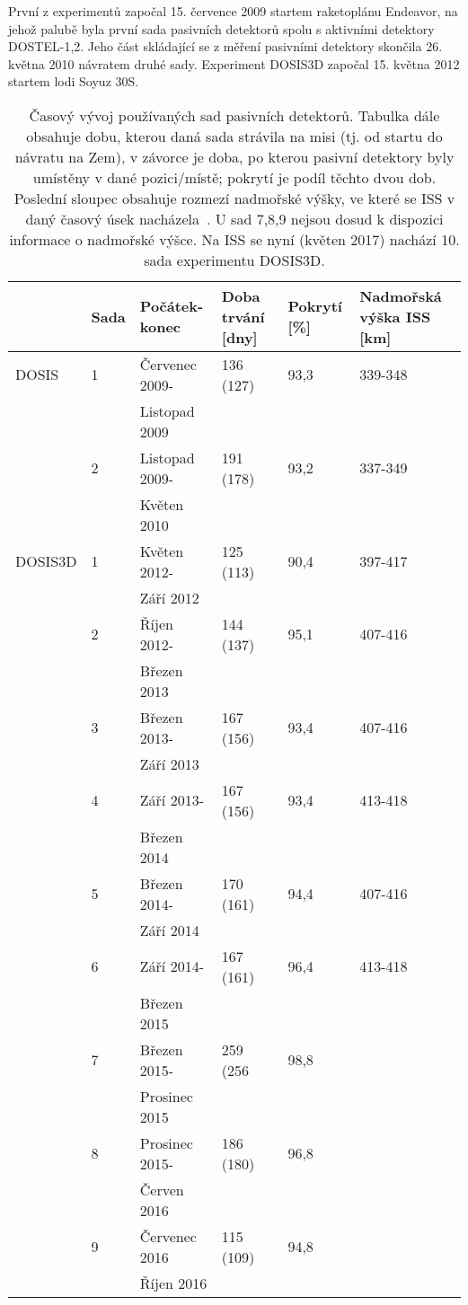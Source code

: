 První z experimentů započal 15. července 2009 startem raketoplánu Endeavor, na jehož palubě byla
první sada pasivních detektorů spolu s aktivními detektory \mbox{DOSTEL-1,2}. Jeho část skládající se z měření pasivními detektory skončila 26. května 2010 návratem druhé sady. Experiment DOSIS3D započal 15. května 2012 startem lodi Soyuz 30S. 
\begin{table}[ht]
  \centering
\footnotesize
  \caption{Časový vývoj používaných sad pasivních detektorů. Tabulka dále obsahuje dobu, kterou daná sada strávila na misi (tj. od startu do návratu na Zem), v závorce je doba, po kterou pasivní detektory byly umístěny v dané pozici/místě; pokrytí je podíl těchto dvou dob. Poslední sloupec obsahuje rozmezí nadmořské výšky, ve které se ISS v daný časový úsek nacházela~\cite{dosis}. U sad 7,8,9 nejsou dosud k dispozici informace o nadmořské výšce. Na ISS se nyní (květen 2017) nachází 10. sada experimentu DOSIS3D.}
  \label{tab:dosis_timeline_passive}
  \begin{tabularx}{\textwidth}{llllll}
	\toprule
	&Sada&	Počátek-konec	&Doba trvání [dny]	&Pokrytí [\%]	&Nadmořská výška ISS [km]\\
	\midrule
DOSIS	&1	&Červenec 2009-	&136 (127)	&93,3	&339-348\\
		&	&Listopad 2009	&		    &       &       \\
		&2	&Listopad 2009-	&191 (178)	&93,2	&337-349\\
		&	&Květen 2010	&		    &       &       \\
DOSIS3D	&1	&Květen 2012-	&125 (113)	&90,4	&397-417\\
		&	&Září 2012		&	        &       &       \\
		&2	&Říjen 2012-	&144 (137)	&95,1	&407-416\\
		&	&Březen 2013	&		    &       &       \\
		&3	&Březen 2013-	&167 (156)	&93,4	&407-416\\
		&	&Září 2013		&	        &       &       \\
		&4	&Září 2013-		&167 (156)	&93,4	&413-418\\
		&	&Březen 2014	&		    &       &       \\
		&5	&Březen 2014-	&170 (161)	&94,4	&407-416\\
		&	&Září 2014		&	        &       &       \\
		&6	&Září 2014-		&167 (161)	&96,4	&413-418\\
		&	&Březen 2015	&			&		&		\\
		&7	&Březen 2015-	&259 (256	&98,8	&		\\
		&	&Prosinec 2015	&			&		&		\\
		&8	&Prosinec 2015- &186 (180)	&96,8	&		\\
		&	&Červen 2016	&			&		&		\\
		&9	&Červenec 2016	&115 (109)	&94,8	&		\\
		&	&Říjen 2016		&			&		&		\\
		\bottomrule
  \end{tabularx}
\end{table}
